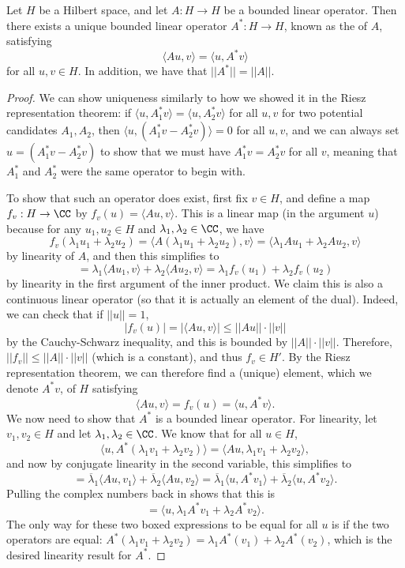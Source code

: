 \begin{theorem}
Let $H$ be a Hilbert space, and let $A: H \to H$ be a bounded linear operator. Then there exists a unique bounded linear operator $A^\ast: H \to H$, known as the  of $A$, satisfying 
\[
    \langle Au, v \rangle = \langle u, A^\ast v \rangle
\]
for all $u, v \in H$. In addition, we have that $||A^\ast|| = ||A||$.
\end{theorem}
\begin{proof}
We can show uniqueness similarly to how we showed it in the Riesz representation theorem: if $\langle u, A_1^\ast v \rangle= \langle u, A_2^\ast v \rangle$ for all $u, v$ for two potential candidates $A_1, A_2$, then $\langle u, (A_1^\ast v - A_2^\ast v) \rangle = 0$ for all $u, v$, and we can always set $u = (A_1^\ast v - A_2^\ast v)$ to show that we must have $A_1^\ast v = A_2^\ast v$ for all $v$, meaning that $A_1^\ast$ and $A_2^\ast$ were the same operator to begin with.

To show that such an operator does exist, first fix $v \in H$, and define a map $f_v: H \to \CC$ by $f_v(u) = \langle Au, v \rangle$. This is a linear map (in the argument $u$) because for any $u_1, u_2 \in H$ and $\lambda_1, \lambda_2 \in \CC$, we have
\[
    f_v(\lambda_1 u_1 + \lambda_2 u_2) = \langle A(\lambda_1 u_1 + \lambda_2 u_2), v \rangle = \langle \lambda_1 Au_1 + \lambda_2 Au_2, v \rangle
\]
by linearity of $A$, and then this simplifies to 
\[
    = \lambda_1 \langle Au_1, v \rangle + \lambda_2 \langle Au_2, v \rangle = \lambda_1 f_v(u_1) + \lambda_2 f_v(u_2)
\]  
by linearity in the first argument of the inner product. We claim this is also a continuous linear operator (so that it is actually an element of the dual). Indeed, we can check that if $||u|| = 1$, 
\[
    |f_v(u)| = |\langle Au, v \rangle| \le ||Au|| \cdot ||v||
\]
by the Cauchy-Schwarz inequality, and this is bounded by $||A|| \cdot ||v||$. Therefore, $||f_v|| \le ||A|| \cdot ||v||$ (which is a constant), and thus $f_v \in H'$. By the Riesz representation theorem, we can therefore find a (unique) element, which we denote $A^\ast v$, of $H$ satisfying
\[
    \langle Au, v \rangle = f_v(u) = \langle u, A^\ast v \rangle.
\]
We now need to show that $A^\ast$ is a bounded linear operator. For linearity, let $v_1, v_2 \in H$ and let $\lambda_1, \lambda_2 \in \CC$. We know that for all $u \in H$, 
\[
    \boxed{\langle u, A^\ast(\lambda_1 v_1 + \lambda_2 v_2) \rangle} = \langle Au, \lambda_1 v_1 + \lambda_2 v_2 \rangle,
\]
and now by conjugate linearity in the second variable, this simplifies to 
\[
    = \overline{\lambda}_1 \langle Au, v_1 \rangle + \overline{\lambda}_2 \langle Au, v_2 \rangle = \overline{\lambda}_1 \langle u, A^\ast v_1 \rangle + \overline{\lambda}_2 \langle u, A^\ast v_2 \rangle.
\]
Pulling the complex numbers back in shows that this is 
\[
    = \boxed{\langle u, \lambda_1 A^\ast v_1 + \lambda_2 A^\ast v_2 \rangle}.
\]
The only way for these two boxed expressions to be equal for all $u$ is if the two operators are equal: $A^\ast(\lambda_1 v_1 + \lambda_2v_2) = \lambda_1 A^\ast(v_1) + \lambda_2 A^\ast(v_2)$, which is the desired linearity result for $A^\ast$.


\end{proof}
